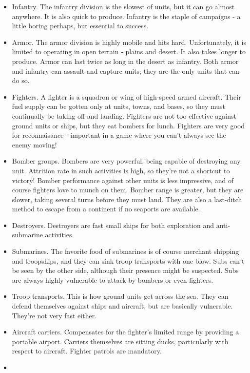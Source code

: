 \begin{itemize}
\item
Infantry.  The infantry division is the slowest of units, but it can go almost
anywhere.  It is also quick to produce.  Infantry is the staple of
campaigns - a little boring perhaps, but essential to success.
\item
Armor.  The armor division is highly mobile and hits hard.  Unfortunately,
it is limited to operating in open terrain - plains and desert.  It also
takes longer to produce.  Armor can last twice as long in the 
desert as infantry.  Both armor and infantry can
assault and capture units; they are the only units that can do so.
\item
Fighters.  A fighter is a squadron or wing of high-speed armed aircraft.
Their fuel supply can be gotten only at units, towns, and bases, so they
must continually be taking off and landing.  Fighters are not too effective
against ground units or ships, but they eat bombers for lunch.  Fighters
are very good for reconnaisance - important in a game where you can't always
see the enemy moving!
\item
Bomber groups.  Bombers are very powerful, being capable of destroying any
unit.  Attrition rate in such activities is high,
so they're not a shortcut to victory!  Bomber performance against
other units is less impressive, and of course fighters love to munch on them.
Bomber range is greater, but they are slower, taking several turns before they
must land.  They are also a last-ditch method to escape from a continent
if no seaports are available.
\item
Destroyers.  Destroyers are fast small ships for both exploration and
anti-submarine activities.
\item
Submarines.  The favorite food of submarines is of course merchant shipping
and troopships, and they can sink troop transports with one blow.
Subs can't be seen by the other side,  although their
presence might be suspected.  Subs are always highly vulnerable to attack
by bombers or even fighters.
\item
Troop transports.
This is how ground units get across the sea.  They can defend
themselves against ships and aircraft, but are basically vulnerable.
They're not very fast either.
\item
Aircraft carriers.  Compensates for the fighter's limited range by providing
a portable airport.  Carriers themselves are sitting ducks, particularly
with respect to aircraft.  Fighter patrols are mandatory.
\item

\end{itemize}
